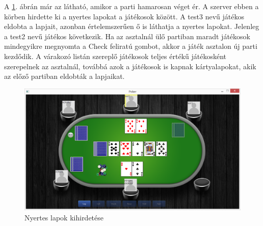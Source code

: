A \ref{fig:parti_4}. ábrán már az látható, amikor a parti hamarosan véget ér. A szerver ebben a körben hirdette ki a nyertes lapokat a játékosok között. A test3 nevű játékos eldobta a lapjait, azonban értelemszerűen ő is láthatja a nyertes lapokat. Jelenleg a test2 nevű játékos következik. Ha az asztalnál ülő partiban maradt játékosok mindegyikre megnyomta a Check feliratú gombot, akkor a játék asztalon új parti kezdődik. A várakozó listán szereplő játékosok teljes értékű játékosként szerepelnek az asztalnál, továbbá azok a játékosok is kapnak kártyalapokat, akik az előző partiban eldobták a lapjaikat.
 \begin{figure}[h!]
  \caption{Nyertes lapok kihirdetése}
  \label{fig:parti_4}
  \centering
    \includegraphics[width=\textwidth]{user-documentation/images/parti/parti_4.jpg}
\end{figure}

\clearpage
